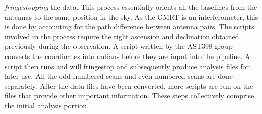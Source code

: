 \documentclass[a4paper,12pt]{article}
\begin{document}
\emph{fringestopping} the data. This process essentially orients all the baselines from the antennas to the same position in the sky. As the GMRT is an interferometer, this is done by accounting for the path difference between antenna pairs. The scripts involved in the process require the right ascension and declination obtained previously during the observation. A script written by the AST398 group converts the coordinates into radians before they are input into the pipeline. A script then runs and will fringestop and subsequently produce analysis files for later use. All the odd numbered scans and even numbered scans are done separately. After the data files have been converted, more scripts are run on the files that provide other important information. These steps collectively comprise the initial analysis portion. 
\end{document}
